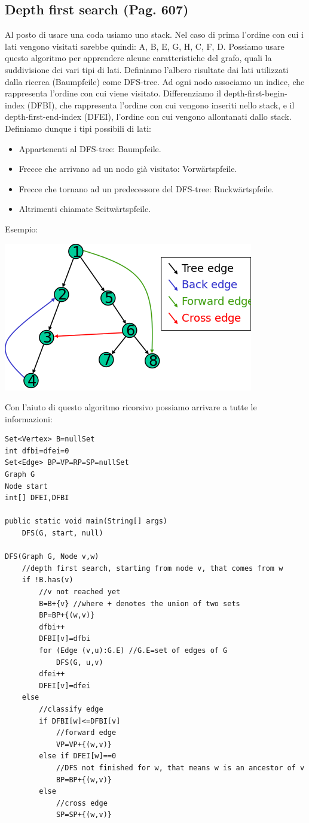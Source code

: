 \documentclass[a4paper]{book}
\newcommand{\lstIndent}{4}
\begin{document}
\subsection{Depth first search (Pag. 607)}
Al posto di usare una coda usiamo uno stack. Nel caso di prima l'ordine con cui i lati vengono visitati sarebbe quindi: A, B, E, G, H, C, F, D. Possiamo usare questo algoritmo per apprendere alcune caratteristiche del grafo, quali la suddivisione dei vari tipi di lati. Definiamo l'albero risultate dai lati utilizzati dalla ricerca (Baumpfeile) come DFS-tree. Ad ogni nodo associamo un indice, che rappresenta l'ordine con cui viene visitato. Differenziamo il depth-first-begin-index (DFBI), che rappresenta l'ordine con cui vengono inseriti nello stack, e il depth-first-end-index (DFEI), l'ordine con cui vengono allontanati dallo stack. Definiamo dunque i tipi possibili di lati:
\begin{itemize}
\item Appartenenti al DFS-tree: Baumpfeile.
\item Frecce che arrivano ad un nodo già visitato: Vorwärtspfeile.
\item Frecce che tornano ad un predecessore del DFS-tree: Ruckwärtspfeile.
\item Altrimenti chiamate Seitwärtspfeile.
\end{itemize}
Esempio:
\begin{center}
\includegraphics[scale=0.7]{Figures/edgetype.png}
\end{center}
Con l'aiuto di questo algoritmo ricorsivo possiamo arrivare a tutte le informazioni:
\begin{lstlisting}[tabsize=\lstIndent]
Set<Vertex> B=nullSet
int dfbi=dfei=0
Set<Edge> BP=VP=RP=SP=nullSet
Graph G
Node start
int[] DFEI,DFBI

public static void main(String[] args)
	DFS(G, start, null)

DFS(Graph G, Node v,w)
	//depth first search, starting from node v, that comes from w
	if !B.has(v)
		//v not reached yet
		B=B+{v} //where + denotes the union of two sets
		BP=BP+{(w,v)}
		dfbi++
		DFBI[v]=dfbi
		for (Edge (v,u):G.E) //G.E=set of edges of G
			DFS(G, u,v)
		dfei++
		DFEI[v]=dfei
	else
		//classify edge
		if DFBI[w]<=DFBI[v]
			//forward edge
			VP=VP+{(w,v)}
		else if DFEI[w]==0 
			//DFS not finished for w, that means w is an ancestor of v
			BP=BP+{(w,v)}
		else
			//cross edge
			SP=SP+{(w,v)}			
\end{lstlisting}
\end{document}
